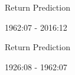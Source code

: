 \documentclass{beamer}
\begin{document}
\begin{frame}{Return Prediction}
	\vspace{-6pt}
	\begin{center}
		1962:07 - 2016:12
	\end{center}
	\vspace{-30pt}
	\begin{table}
		\begin{adjustbox}{width=\textwidth,height=3.5cm}
			
		\end{adjustbox}
	\end{table}
\end{frame}

%			
%		

\begin{frame}{Return Prediction}
	\vspace{-6pt}
	\begin{center}
		1926:08 - 1962:07
	\end{center}
	\vspace{-30pt}
	\begin{table}
		\begin{adjustbox}{width=\textwidth,height=3.5cm}
			
		\end{adjustbox}
		
	\end{table}
\end{frame}

\end{document}
